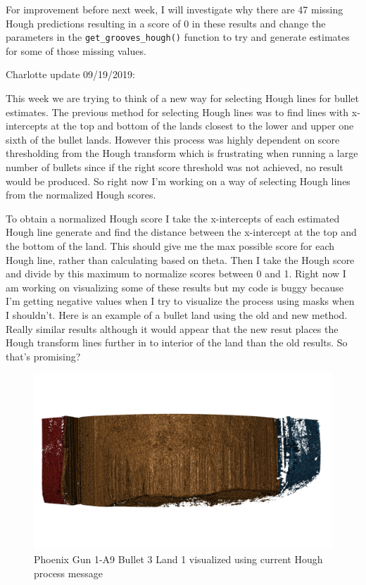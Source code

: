\documentclass[]{book}
\begin{document}
For improvement before next week, I will investigate why there are 47 missing Hough
predictions resulting in a score of 0 in these results and change the parameters in the
\texttt{get\_grooves\_hough()} function to try and generate estimates for some of those missing values.

Charlotte update 09/19/2019:

This week we are trying to think of a new way for selecting Hough lines for bullet estimates. The previous method for selecting Hough lines was to find lines with x-intercepts at the top and bottom of the lands closest to the lower and upper one sixth of the bullet lands. However this process was highly dependent on score thresholding from the Hough transform which is frustrating when running a large number of bullets since if the right score threshold was not achieved, no result would be produced. So right now I'm working on a way of selecting Hough lines from the normalized Hough scores.

To obtain a normalized Hough score I take the x-intercepts of each estimated Hough line generate and find the distance between the x-intercept at the top and the bottom of the land. This should give me the max possible score for each Hough line, rather than calculating based on theta. Then I take the Hough score and divide by this maximum to normalize scores between 0 and 1. Right now I am working on visualizing some of these results but my code is buggy because I'm getting negative values when I try to visualize the process using masks when I shouldn't. Here is an example of a bullet land using the old and new method. Really similar results although it would appear that the new resut places the Hough transform lines further in to interior of the land than the old results. So that's promising?

\begin{figure}

{\centering \includegraphics[width=0.5\linewidth]{images/bullets/Hough_project/phoenix_current_hough_land1} 

}

\caption{Phoenix Gun 1-A9 Bullet 3 Land 1 visualized using current Hough process message}\label{fig:unnamed-chunk-15}
\end{figure}
\end{document}
